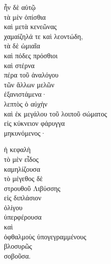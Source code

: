 {\large
\begin{greek}
\noindent ἦν δὲ αὐτῷ \\
τὰ μὲν ὀπίσθια \\
καὶ μετὰ κενεῶνας \\
\tabto{2em} χαμαίζηλά τε καὶ λεοντώδη, \\
τὰ δὲ ὠμιαῖα \\
καὶ πόδες πρόσθιοι \\
καὶ στέρνα \\
\tabto{2em} πέρα τοῦ ἀναλόγου \\
\tabto{4em} τῶν ἄλλων μελῶν \\
\tabto{6em} ἐξανιστάμενα· \\
λεπτὸς ὁ αὐχὴν \\
\tabto{2em} καὶ ἐκ μεγάλου τοῦ λοιποῦ σώματος \\
\tabto{4em} εἰς κύκνειον φάρυγγα \\
\tabto{6em} μηκυνόμενος·

ἡ κεφαλὴ\\
\tabto{2em} τὸ μὲν εἶδος \\
\tabto{4em} καμηλίζουσα\\
\tabto{2em} τὸ μέγεθος δὲ \\
\tabto{4em} στρουθοῦ Λιβύσσης \\
\tabto{6em} εἰς διπλάσιον \\
\tabto{8em} ὀλίγου \\
\tabto{10em} ὑπερφέρουσα \\
\tabto{4em} καὶ \\
\tabto{6em} ὀφθαλμοὺς ὑπογεγραμμένους \\
\tabto{8em} βλοσυρῶς \\
\tabto{10em} σοβοῦσα.\\

\end{greek}
}

